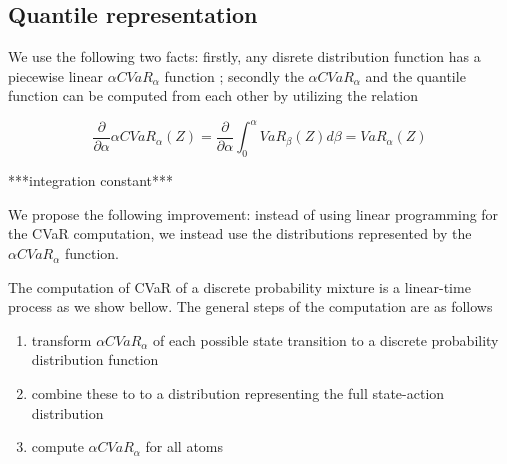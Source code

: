 \subsection{Quantile representation}

We use the following two facts: firstly, any disrete distribution function has a piecewise linear $\alpha CVaR_\alpha$ function \cite{rockafellar2000optimization}; secondly the $\alpha CVaR_\alpha$ and the quantile function can be computed from each other by utilizing the relation

\begin{equation}
\dfrac{\partial}{\partial \alpha} \alpha CVaR_\alpha(Z) = \dfrac{\partial}{\partial \alpha} \int_0^\alpha VaR_\beta(Z) d\beta = VaR_\alpha(Z)
\end{equation}

***integration constant***

We propose the following improvement: instead of using linear programming for the CVaR computation, we instead use the distributions represented by the $\alpha CVaR_\alpha$ function. 

The computation of CVaR of a discrete probability mixture is a linear-time process as we show bellow. The general steps of the computation are as follows

\begin{enumerate}
\item transform $\alpha CVaR_\alpha$ of each possible state transition to a discrete probability distribution function
\item combine these to to a distribution representing the full state-action distribution
\item compute $\alpha CVaR_\alpha$ for all atoms
\end{enumerate}




